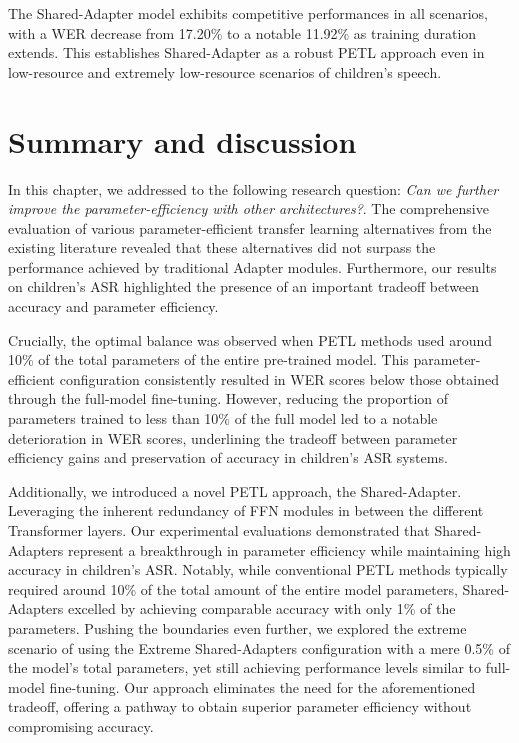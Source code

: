 The Shared-Adapter model exhibits competitive performances in all scenarios, with a \ac{WER} decrease from 17.20\% to a notable 11.92\% as training duration extends. This establishes Shared-Adapter as a robust \ac{PETL} approach even in low-resource and extremely low-resource scenarios of children's speech.

\section{Summary and discussion}
In this chapter, we addressed to the following research question: \textit{Can we further improve the parameter-efficiency with other architectures?}. The comprehensive evaluation of various parameter-efficient transfer learning alternatives from the existing literature revealed that these alternatives did not surpass the performance achieved by traditional Adapter modules. Furthermore, our results on children's \ac{ASR} highlighted the presence of an important tradeoff between accuracy and parameter efficiency.

Crucially, the optimal balance was observed when \ac{PETL} methods used around 10\% of the total parameters of the entire pre-trained model. This parameter-efficient configuration consistently resulted in \ac{WER} scores below those obtained through the full-model fine-tuning. However, reducing the proportion of parameters trained to less than 10\% of the full model led to a notable deterioration in \ac{WER} scores, underlining the tradeoff between parameter efficiency gains and preservation of accuracy in children's \ac{ASR} systems.


Additionally, we introduced a novel \ac{PETL} approach, the Shared-Adapter. Leveraging the inherent redundancy of \ac{FFN} modules in between the different Transformer layers. Our experimental evaluations demonstrated that Shared-Adapters represent a breakthrough in parameter efficiency while maintaining high accuracy in children's \ac{ASR}. Notably, while conventional \ac{PETL} methods typically required around 10\% of the total amount of the entire model parameters, Shared-Adapters excelled by achieving comparable accuracy with only 1\% of the parameters. Pushing the boundaries even further, we explored the extreme scenario of using the Extreme Shared-Adapters configuration with a mere 0.5\% of the model's total parameters, yet still achieving performance levels similar to full-model fine-tuning. Our approach eliminates the need for the aforementioned tradeoff, offering a pathway to obtain superior parameter efficiency without compromising accuracy.

